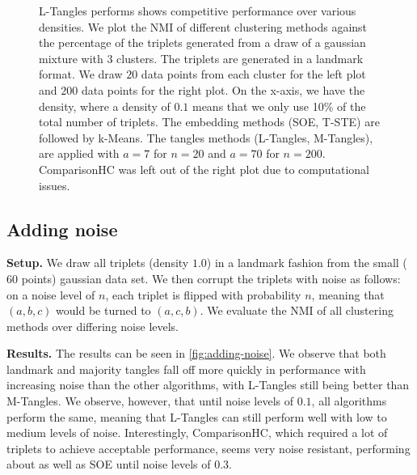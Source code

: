 \begin{figure}[ht]
    \centering
    \caption{
        L-Tangles performs shows competitive performance over various densities. We plot the NMI of different clustering methods against the percentage of the triplets generated from 
        a draw of a gaussian mixture with $3$ clusters. The triplets are generated in a landmark format.
        We draw $20$ data points from each cluster for the left plot and $200$ data points for the right plot.
        On the x-axis, we have the density, where a density of $0.1$ means that we only use 10\% of the total number of triplets. The embedding methods (SOE, T-STE) are 
        followed by k-Means. The tangles methods (L-Tangles, M-Tangles), are applied with $a=7$ for $n=20$ and $a=70$ for $n=200$. 
        ComparisonHC was left out of the right plot due to computational issues.}
    \label{fig:density-change}
\end{figure}


\subsection{Adding noise}\label{sec:adding-noise}
\textbf{Setup.}
We draw all triplets (density $1.0$) in a landmark fashion from the small ($60$ points) gaussian data set. We then corrupt the triplets with noise as follows:
on a noise level of $n$, each triplet is flipped with probability $n$, meaning that $(a,b,c)$ would be turned to $(a,c,b)$.
We evaluate the NMI of all clustering methods over differing noise levels.

\noindent
\textbf{Results.}
The results can be seen in \autoref{fig:adding-noise}.
We observe that both landmark and majority tangles fall off more quickly in performance with increasing noise 
than the other algorithms, with L-Tangles still being better than M-Tangles. 
We observe, however, that until noise levels of $0.1$, all algorithms perform the same, meaning that L-Tangles can still perform well with low to medium levels of noise. Interestingly, ComparisonHC, which 
required a lot of triplets to achieve acceptable performance, seems 
very noise resistant, performing about as well as SOE until noise levels of 0.3.

